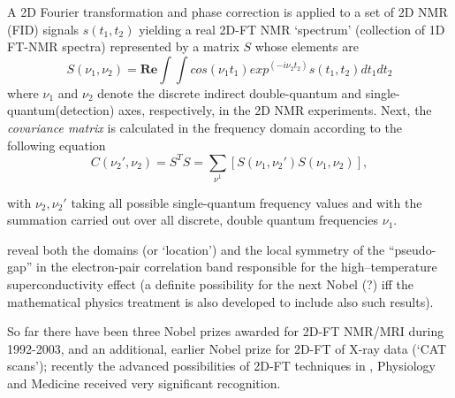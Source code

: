 \documentclass[12pt]{article}
\theoremstyle{plain}
\theoremstyle{definition}
\numberwithin{equation}{section}
\begin{document}
 A 2D Fourier transformation and phase correction is applied to a set of 2D NMR (FID) signals $s(t_1, t_2)$ yielding a real 2D-FT NMR `spectrum' (collection of 1D FT-NMR spectra) represented by a matrix $S$ whose elements are 
$$S(\nu_1,\nu_2) = \textbf{Re} \int \int cos(\nu_1 t_1)exp^{(-i\nu_2 t_2)} s(t_1, t_2)dt_1 dt_2$$
where $\nu_1$ and $\nu_2$ denote the discrete indirect double-quantum and single-quantum(detection) axes, respectively,
in the 2D NMR experiments. Next, the \emph{covariance matrix} is calculated in the frequency domain according
to the following equation 
$$ C(\nu_2', \nu_2) =  S^T S = \sum_{\nu^1}[S(\nu_1,\nu_2')S(\nu_1,\nu_2)],$$

 with $\nu_2, \nu_2'$ taking all possible single-quantum frequency values and  with the summation carried out over all discrete, double quantum
frequencies $\nu_1$.


  reveal both the domains (or `location') and the local symmetry of the ``pseudo-gap'' in the electron-pair correlation band responsible for the high--temperature superconductivity effect (a definite
possibility for the next Nobel (?) iff the mathematical physics treatment is also developed to include also
such results). 

  So far there have been three Nobel prizes awarded for 2D-FT NMR/MRI during 1992-2003, and an additional,
earlier Nobel prize for 2D-FT of X-ray data (`CAT scans'); recently the advanced possibilities
of 2D-FT techniques in 
, Physiology and Medicine received very significant recognition.
\end{document}
